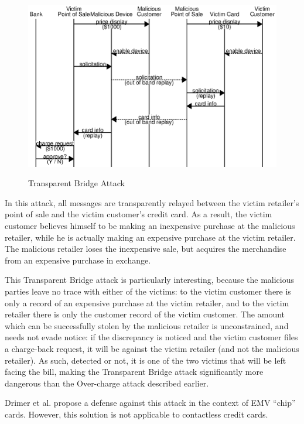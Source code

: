 \begin{figure}
  \caption{Transparent Bridge Attack}
  \centering
  	\hspace*{-0.35in}
    \includegraphics{img/attack-mr-bridge.eps}
  \label{fig:attack_bridge}
\end{figure}

In this attack, all messages are transparently relayed between the victim retailer's point of sale and the victim customer's credit card.
As a result, the victim customer believes himself to be making an inexpensive purchase at the malicious retailer, while he is actually making an expensive purchase at the victim retailer.
The malicious retailer loses the inexpensive sale, but acquires the merchandise from an expensive purchase in exchange.

This Transparent Bridge attack is particularly interesting, because the malicious parties leave no trace with either of the victims:
to the victim customer there is only a record of an expensive purchase at the victim retailer, and to the victim retailer there is only the customer record of the victim customer.
The amount which can be successfully stolen by the malicious retailer is unconstrained, and needs not evade notice:
	if the discrepancy is noticed and the victim customer files a charge-back request, it will be against the victim retailer (and not the malicious retailer).
As such, detected or not, it is one of the two victims that will be left facing the bill, making the Transparent Bridge attack significantly more dangerous than the Over-charge attack described earlier.

Drimer et al. propose a defense against this attack in the context of EMV ``chip'' cards.
However, this solution is not applicable to contactless credit cards.
